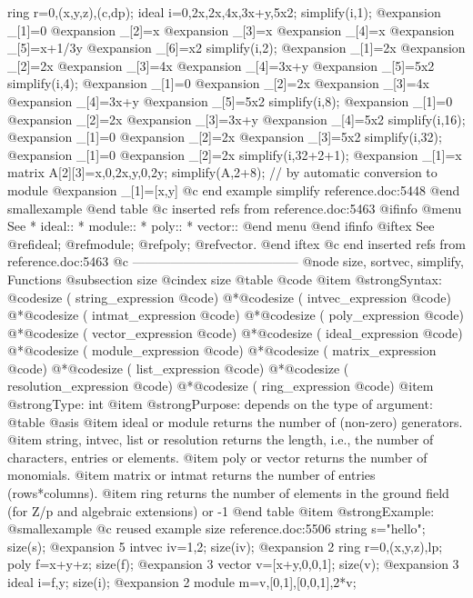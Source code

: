 {{{{{{ring r=0,(x,y,z),(c,dp);
ideal i=0,2x,2x,4x,3x+y,5x2;
simplify(i,1);
@expansion{} _[1]=0
@expansion{} _[2]=x
@expansion{} _[3]=x
@expansion{} _[4]=x
@expansion{} _[5]=x+1/3y
@expansion{} _[6]=x2
simplify(i,2);
@expansion{} _[1]=2x
@expansion{} _[2]=2x
@expansion{} _[3]=4x
@expansion{} _[4]=3x+y
@expansion{} _[5]=5x2
simplify(i,4);
@expansion{} _[1]=0
@expansion{} _[2]=2x
@expansion{} _[3]=4x
@expansion{} _[4]=3x+y
@expansion{} _[5]=5x2
simplify(i,8);
@expansion{} _[1]=0
@expansion{} _[2]=2x
@expansion{} _[3]=3x+y
@expansion{} _[4]=5x2
simplify(i,16);
@expansion{} _[1]=0
@expansion{} _[2]=2x
@expansion{} _[3]=5x2
simplify(i,32);
@expansion{} _[1]=0
@expansion{} _[2]=2x
simplify(i,32+2+1);
@expansion{} _[1]=x
matrix A[2][3]=x,0,2x,y,0,2y;
simplify(A,2+8); // by automatic conversion to module
@expansion{} _[1]=[x,y]
@c end example simplify reference.doc:5448
@end smallexample
@end table
@c inserted refs from reference.doc:5463
@ifinfo
@menu
See
* ideal::
* module::
* poly::
* vector::
@end menu
@end ifinfo
@iftex
See
@ref{ideal};
@ref{module};
@ref{poly};
@ref{vector}.
@end iftex
@c end inserted refs from reference.doc:5463
@c ---------------------------------------
@node size, sortvec, simplify, Functions
@subsection size
@cindex size
@table @code
@item @strong{Syntax:}
@code{size (} string_expression @code{)}
@*@code{size (} intvec_expression @code{)}
@*@code{size (} intmat_expression @code{)}
@*@code{size (} poly_expression @code{)}
@*@code{size (} vector_expression @code{)}
@*@code{size (} ideal_expression @code{)}
@*@code{size (} module_expression @code{)}
@*@code{size (} matrix_expression @code{)}
@*@code{size (} list_expression @code{)}
@*@code{size (} resolution_expression @code{)}
@*@code{size (} ring_expression @code{)}
@item @strong{Type:}
int
@item @strong{Purpose:}
depends on the type of argument:
@table @asis
@item ideal or module
returns the number of (non-zero) generators.
@item string, intvec, list or resolution
returns the length, i.e., the number of characters, entries or elements.
@item poly or vector
returns the number of monomials.
@item matrix or intmat
returns the number of entries (rows*columns).
@item ring
returns the number of elements in the ground field
(for Z/p and algebraic extensions) or -1
@end table
@item @strong{Example:}
@smallexample
@c reused example size reference.doc:5506 
  string s="hello";
  size(s);
@expansion{} 5
  intvec iv=1,2;
  size(iv);
@expansion{} 2
  ring r=0,(x,y,z),lp;
  poly f=x+y+z;
  size(f);
@expansion{} 3
  vector v=[x+y,0,0,1];
  size(v);
@expansion{} 3
  ideal i=f,y;
  size(i);
@expansion{} 2
  module m=v,[0,1],[0,0,1],2*v;
}}}}}}
